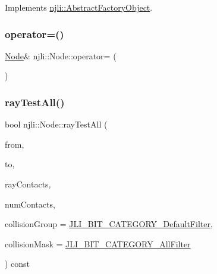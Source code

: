 \begin{DoxyCodeInclude}
\end{DoxyCodeInclude}


Implements \mbox{\hyperlink{classnjli_1_1_abstract_factory_object_a838f4fa7e65cace6098aab5222892942}{njli\+::\+Abstract\+Factory\+Object}}.

\mbox{\label{classnjli_1_1_node_a489763eb75c752e2d650b1ae81b08fbc}} 
\subsubsection{\texorpdfstring{operator=()}{operator=()}}
{\footnotesize\ttfamily \mbox{\hyperlink{classnjli_1_1_node}{Node}}\& njli\+::\+Node\+::operator= (\begin{DoxyParamCaption}\item[{const \mbox{\hyperlink{classnjli_1_1_node}{Node}} \&}]{ }\end{DoxyParamCaption})\hspace{0.3cm}{\ttfamily [protected]}}

\mbox{\label{classnjli_1_1_node_af9fb9a65a5f91bb4528bc71d5afb5beb}} 
\subsubsection{\texorpdfstring{ray\+Test\+All()}{rayTestAll()}\hspace{0.1cm}{\footnotesize\ttfamily [1/2]}}
{\footnotesize\ttfamily bool njli\+::\+Node\+::ray\+Test\+All (\begin{DoxyParamCaption}\item[{const bt\+Vector3 \&}]{from,  }\item[{const bt\+Vector3 \&}]{to,  }\item[{bt\+Aligned\+Object\+Array$<$ \mbox{\hyperlink{classnjli_1_1_physics_ray_contact}{Physics\+Ray\+Contact}} $\ast$$>$ \&}]{ray\+Contacts,  }\item[{\mbox{\hyperlink{_util_8h_aa62c75d314a0d1f37f79c4b73b2292e2}{s32}} \&}]{num\+Contacts,  }\item[{\mbox{\hyperlink{namespacenjli_af7b302a2b48bb644f85c88080925c974}{njli\+Bit\+Categories}}}]{collision\+Group = {\ttfamily \mbox{\hyperlink{namespacenjli_af7b302a2b48bb644f85c88080925c974a53b33337014e199f56e752574f36981e}{J\+L\+I\+\_\+\+B\+I\+T\+\_\+\+C\+A\+T\+E\+G\+O\+R\+Y\+\_\+\+Default\+Filter}}},  }\item[{\mbox{\hyperlink{namespacenjli_af7b302a2b48bb644f85c88080925c974}{njli\+Bit\+Categories}}}]{collision\+Mask = {\ttfamily \mbox{\hyperlink{namespacenjli_af7b302a2b48bb644f85c88080925c974a0fba80cad161dda96de5cbda9091cdce}{J\+L\+I\+\_\+\+B\+I\+T\+\_\+\+C\+A\+T\+E\+G\+O\+R\+Y\+\_\+\+All\+Filter}}} }\end{DoxyParamCaption}) const}



